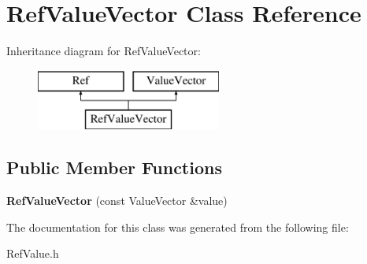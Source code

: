 \hypertarget{class_ref_value_vector}{}\section{Ref\+Value\+Vector Class Reference}
\label{class_ref_value_vector}
Inheritance diagram for Ref\+Value\+Vector\+:\begin{figure}[H]
\begin{center}
\leavevmode
\includegraphics[height=2.000000cm]{d6/d60/class_ref_value_vector}
\end{center}
\end{figure}
\subsection*{Public Member Functions}
\begin{DoxyCompactItemize}
\item 
\mbox{\label{class_ref_value_vector_ab7c2afe8050297feb46436181d08c1ae}} 
{\bfseries Ref\+Value\+Vector} (const Value\+Vector \&value)
\end{DoxyCompactItemize}


The documentation for this class was generated from the following file\+:\begin{DoxyCompactItemize}
\item 
Ref\+Value.\+h\end{DoxyCompactItemize}
